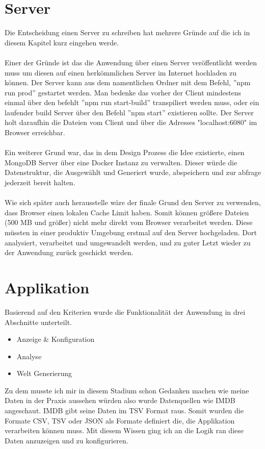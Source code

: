 \section{Server}
Die Entscheidung einen Server zu schreiben hat mehrere Gründe auf die ich in diesem Kapitel kurz eingehen werde. \\ \\
Einer der Gründe ist das die Anwendung über einen Server veröffentlicht werden muss um diesen auf einen herkömmlichen Server im Internet
hochladen zu können. Der Server kann aus dem namentlichen Ordner mit dem Befehl, ''npm run prod'' gestartet werden.  Man bedenke das vorher
der Client mindestens einmal über den befehlt ''npm run start-build'' transpiliert werden muss, oder ein laufender build Server über den
Befehl ''npm start'' existieren sollte. Der Server holt daraufhin die Dateien vom Client und über die Adresses "localhost:6080" im Browser
erreichbar.\\ \\
Ein weiterer Grund war, das in dem Design Prozess die Idee existierte, einen MongoDB Server über eine Docker Instanz
zu verwalten. Dieser würde die Datenstruktur, die Ausgewählt und Generiert wurde, abspeichern und zur abfrage jederzeit bereit halten. \\ \\
Wie sich später auch herausstelle wäre der finale Grund den Server zu verwenden, dass Browser einen lokalen Cache Limit haben. Somit können
größere Dateien (500 MB und größer) nicht mehr direkt vom Browser verarbeitet werden. Diese müssten in einer produktiv Umgebung erstmal auf
den Server hochgeladen. Dort analysiert, verarbeitet und umgewandelt werden, und zu guter Letzt wieder zu der Anwendung zurück geschickt
werden. \\
\newpage

\section{Applikation}
Basierend auf den Kriterien wurde die Funktionalität der Anwendung in drei Abschnitte unterteilt.
\begin{itemize}
    \item Anzeige \& Konfiguration
    \item Analyse
    \item Welt Generierung
\end{itemize}
Zu dem musste ich mir in diesem Stadium schon Gedanken machen wie meine Daten in der Praxis aussehen würden also wurde Datenquellen wie
IMDB angeschaut. IMDB gibt seine Daten im TSV Format raus. Somit wurden die Formate CSV, TSV oder JSON als Formate definiert die, die
Applikation verarbeiten können muss. Mit diesem Wissen ging ich an die Logik ran diese Daten anzuzeigen und zu konfigurieren.

